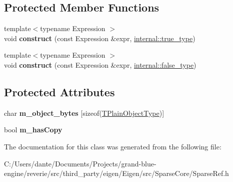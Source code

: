 \subsection*{Protected Member Functions}
\begin{DoxyCompactItemize}
\item 
\mbox{\label{class_eigen_1_1_ref_3_01const_01_sparse_vector_3_01_mat_scalar_00_01_mat_options_00_01_mat_index673660e6a13ed7a7b712b0f75a25d720_ae8ce9f592620fe64e073219ed676155f}} 
{\footnotesize template$<$typename Expression $>$ }\\void {\bfseries construct} (const Expression \&expr, \mbox{\hyperlink{struct_eigen_1_1internal_1_1true__type}{internal\+::true\+\_\+type}})
\item 
\mbox{\label{class_eigen_1_1_ref_3_01const_01_sparse_vector_3_01_mat_scalar_00_01_mat_options_00_01_mat_index673660e6a13ed7a7b712b0f75a25d720_abd67bf3d73636780f38b4aa78babba7a}} 
{\footnotesize template$<$typename Expression $>$ }\\void {\bfseries construct} (const Expression \&expr, \mbox{\hyperlink{struct_eigen_1_1internal_1_1false__type}{internal\+::false\+\_\+type}})
\end{DoxyCompactItemize}
\subsection*{Protected Attributes}
\begin{DoxyCompactItemize}
\item 
\mbox{\label{class_eigen_1_1_ref_3_01const_01_sparse_vector_3_01_mat_scalar_00_01_mat_options_00_01_mat_index673660e6a13ed7a7b712b0f75a25d720_a09d238d8cb4f140813d8635fe41b6d4c}} 
char {\bfseries m\+\_\+object\+\_\+bytes} \mbox{[}sizeof(\mbox{\hyperlink{class_eigen_1_1_sparse_vector}{T\+Plain\+Object\+Type}})\mbox{]}
\item 
\mbox{\label{class_eigen_1_1_ref_3_01const_01_sparse_vector_3_01_mat_scalar_00_01_mat_options_00_01_mat_index673660e6a13ed7a7b712b0f75a25d720_a2e1cf70757c4c5900a67acaa40e9d0ac}} 
bool {\bfseries m\+\_\+has\+Copy}
\end{DoxyCompactItemize}


The documentation for this class was generated from the following file\+:\begin{DoxyCompactItemize}
\item 
C\+:/\+Users/dante/\+Documents/\+Projects/grand-\/blue-\/engine/reverie/src/third\+\_\+party/eigen/\+Eigen/src/\+Sparse\+Core/Sparse\+Ref.\+h\end{DoxyCompactItemize}
